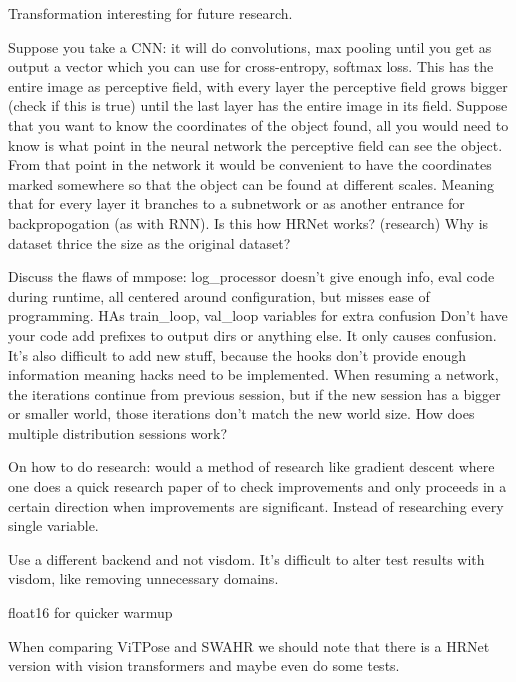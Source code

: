 Transformation interesting for future research.


Suppose you take a \gls{CNN}: it will do convolutions, max pooling until you get as output a vector which you can use for cross-entropy, softmax loss.
This has the entire image as perceptive field, with every layer the perceptive field grows bigger (check if this is true) until the last layer has the entire image in its field.
Suppose that you want to know the coordinates of the object found, all you would need to know is what point in the neural network the perceptive field can see the object.
From that point in the network it would be convenient to have the coordinates marked somewhere so that the object can be found at different scales.
Meaning that for every layer it branches to a subnetwork or as another entrance for backpropogation (as with RNN).
Is this how HRNet works? (research)
Why is dataset thrice the size as the original dataset?




Discuss the flaws of mmpose: log\_processor doesn't give enough info, eval code during runtime, all centered around configuration, but misses ease of programming.
HAs train\_loop, val\_loop variables for extra confusion
Don't have your code add prefixes to output dirs or anything else. It only causes confusion.
It's also difficult to add new stuff, because the hooks don't provide enough information meaning hacks need to be implemented.
When resuming a network, the iterations continue from previous session, but if the new session has a bigger or smaller world, those iterations don't match the new world size.
How does multiple distribution sessions work?



On how to do research: would a method of research like gradient descent where one does a quick research paper of to check improvements and only proceeds in a certain direction when improvements are significant.
Instead of researching every single variable.



Use a different backend and not visdom. It's difficult to alter test results with visdom, like removing unnecessary domains.

float16 for quicker warmup

When comparing ViTPose and SWAHR we should note that there is a HRNet version with vision transformers and maybe even do some tests.
